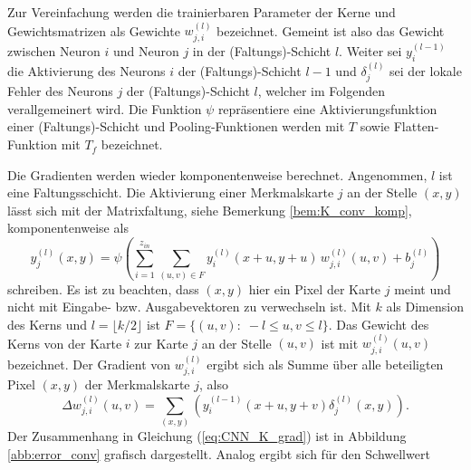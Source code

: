 Zur Vereinfachung werden die trainierbaren Parameter der Kerne und Gewichtsmatrizen als Gewichte $w_{j,i}^{(l)}$ bezeichnet. Gemeint ist also das Gewicht zwischen Neuron $i$  und Neuron $j$ in der (Faltungs)-Schicht $l$. Weiter sei $y_{i}^{(l-1)}$ die Aktivierung des Neurons $i$ der (Faltungs)-Schicht $l-1$ und $\delta_j^{(l)}$ sei der lokale Fehler des Neurons $j$ der (Faltungs)-Schicht $l$, welcher im Folgenden verallgemeinert wird. Die Funktion $\psi$ repräsentiere eine Aktivierungsfunktion einer  (Faltungs)-Schicht und Pooling-Funktionen werden mit $T$ sowie Flatten-Funktion mit $T_f$ bezeichnet.

Die Gradienten werden wieder komponentenweise berechnet.
Angenommen, $l$ ist eine Faltungsschicht. Die Aktivierung einer Merkmalskarte $j$ an der Stelle $(x,y)$ lässt sich mit der Matrixfaltung, siehe Bemerkung \ref{bem:K_conv_komp}, komponentenweise als
\begin{equation}
    y_j^{(l)}(x,y) =\psi \left(\sum_{i=1}^{z_{in}} \sum_{(u,v) \in F} y_i^{(l)}(x+u,y+u)\,  w_{j,i}^{(l)}(u,v) +b_j^{(l)}\right)
\end{equation}   
schreiben. Es ist zu beachten, dass $(x,y)$ hier ein Pixel der Karte $j$ meint und nicht mit Eingabe- bzw. Ausgabevektoren zu verwechseln ist. Mit $k$ als Dimension des Kerns und $l=\lfloor k/2 \rfloor$ ist $F=\{(u,v): \; -l \leq u,v \leq l\}$.
Das Gewicht des Kerns von der Karte $i$ zur Karte $j$ an der Stelle $(u,v)$ ist mit $w^{(l)}_{j,i}(u,v)$ bezeichnet. Der Gradient von $w_{j,i}^{(l)}$ ergibt sich als Summe über alle beteiligten Pixel $(x,y)$ der Merkmalskarte $j$, also
\begin{equation}
    \label{eq:CNN_K_grad}
    \Delta w_{j,i}^{(l)}(u,v)= \sum_{(x,y)} \left( y_i^{(l-1)}(x+u,y+v) \delta_j^{(l)}(x,y)\right).
\end{equation}
Der Zusammenhang in Gleichung (\ref{eq:CNN_K_grad}) ist in Abbildung \ref{abb:error_conv} grafisch dargestellt. Analog ergibt sich für den Schwellwert

